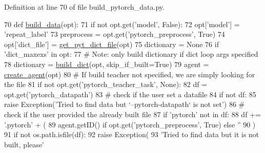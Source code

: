 Definition at line 70 of file build\+\_\+pytorch\+\_\+data.\+py.


\begin{DoxyCode}
70 \textcolor{keyword}{def }\hyperlink{namespaceparlai_1_1scripts_1_1build__pytorch__data_a50d93b1dec37499085b9eafc6e425a1a}{build\_data}(opt):
71     \textcolor{keywordflow}{if} \textcolor{keywordflow}{not} opt.get(\textcolor{stringliteral}{'model'}, \textcolor{keyword}{False}):
72         opt[\textcolor{stringliteral}{'model'}] = \textcolor{stringliteral}{'repeat\_label'}
73     preprocess = opt.get(\textcolor{stringliteral}{'pytorch\_preprocess'}, \textcolor{keyword}{True})
74     opt[\textcolor{stringliteral}{'dict\_file'}] = \hyperlink{namespaceparlai_1_1scripts_1_1build__pytorch__data_a6ec85a5842150af78f5178d75075b0cc}{get\_pyt\_dict\_file}(opt)
75     dictionary = \textcolor{keywordtype}{None}
76     \textcolor{keywordflow}{if} \textcolor{stringliteral}{'dict\_maxexs'} \textcolor{keywordflow}{in} opt:
77         \textcolor{comment}{# Note: only build dictionary if dict loop args specified}
78         dictionary = \hyperlink{namespacebuild__dict}{build\_dict}(opt, skip\_if\_built=\textcolor{keyword}{True})
79     agent = \hyperlink{namespaceparlai_1_1core_1_1agents_ad0d54074d4bcc148bb415ab5515a53b5}{create\_agent}(opt)
80     \textcolor{comment}{# If build teacher not specified, we are simply looking for the file}
81     \textcolor{keywordflow}{if} \textcolor{keywordflow}{not} opt.get(\textcolor{stringliteral}{'pytorch\_teacher\_task'}, \textcolor{keywordtype}{None}):
82         df = opt.get(\textcolor{stringliteral}{'pytorch\_datapath'})
83         \textcolor{comment}{# check if the user set a datafile}
84         \textcolor{keywordflow}{if} \textcolor{keywordflow}{not} df:
85             \textcolor{keywordflow}{raise} Exception(\textcolor{stringliteral}{'Tried to find data but `--pytorch-datapath` is not set'})
86         \textcolor{comment}{# check if the user provided the already built file}
87         \textcolor{keywordflow}{if} \textcolor{stringliteral}{'pytorch'} \textcolor{keywordflow}{not} \textcolor{keywordflow}{in} df:
88             df += \textcolor{stringliteral}{'.pytorch'} + (
89                 agent.getID() \textcolor{keywordflow}{if} opt.get(\textcolor{stringliteral}{'pytorch\_preprocess'}, \textcolor{keyword}{True}) \textcolor{keywordflow}{else} \textcolor{stringliteral}{''}
90             )
91         \textcolor{keywordflow}{if} \textcolor{keywordflow}{not} os.path.isfile(df):
92             \textcolor{keywordflow}{raise} Exception(
93                 \textcolor{stringliteral}{'Tried to find data but it is not built, please'}

\end{DoxyCode}
